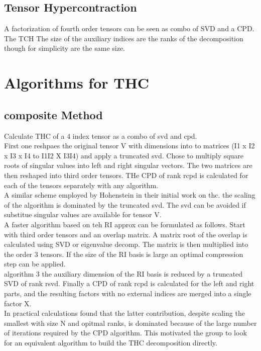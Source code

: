 \documentclass[10pt, draft]{article}
\begin{document}
\subsection{Tensor Hypercontraction}
A factorization of fourth order tensors can be seen as combo of SVD and a CPD. The TCH The size of the auxiliary indices are the ranks of the decomposition though for simplicity are the same size.  

\section{Algorithms for THC}
\subsection{composite Method}
Calculate THC of a 4 index tensor as a combo of svd and cpd.\\
First one reshpaes the original tensor V with dimensions into to matrices  (I1 x I2 x I3 x I4 to I1I2 X I3I4) and apply a truncated svd.  Chose to multiply square roots of singular values into left and right singular vectors.  The two matrices are then reshaped into third order tensors.  THe CPD of rank rcpd is calculated for each of the tensors separately with any algorithm.  \\
A similar scheme employed by Hohenstein in their initial work on thc.  the scaling of the algorithm is dominated by the truncated svd.   The svd can be avoided if substitue singular values are available for tensor V.  \\
A faster algorithm based on teh RI approx can be formulated as follows. Start with third order tensors  and an overlap matrix. A matrix root of the overlap is calculated using SVD or eigenvalue decomp.  The matrix is then multiplied into the order 3 tensors.  If the size of the RI basis is large an optimal compression step can be applied.\\
algorithm 3 the auxiliary dimension of the RI basis is reduced by a truncated SVD of rank rsvd. Finally a CPD of rank rcpd is calculated for the left and right parts, and the resulting factors with no external indices are merged into a single factor X.\\
In practical calculations found that the latter contribution, despite scaling the smallest with size N and opitmal ranks, is dominated because of the large number of iterations required by the CPD algorithm.  This motivated the group to look for an equivalent algorithm to build the THC decomposition directly.
\end{document}
